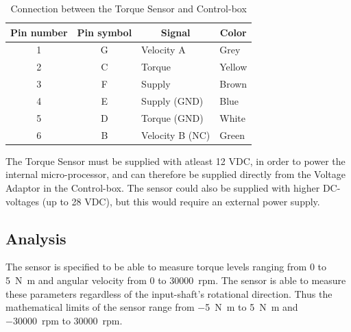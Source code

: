 \begin{table}[h]
	\centering
	\label{my-label}
	\begin{tabular}{|c|c|l|l|}
		\hline
		\textbf{Pin number} & \textbf{Pin symbol} & \multicolumn{1}{c|}{\textbf{Signal}} & \multicolumn{1}{c|}{\textbf{Color}} \\ \hline
		1                   & G                   & Velocity A                           & Grey                                \\ \hline
		2                   & C                   & Torque                               & Yellow                              \\ \hline
		3                   & F                   & Supply		                         & Brown                               \\ \hline
		4                   & E                   & Supply (GND)                         & Blue                                \\ \hline
		5                   & D                   & Torque (GND)                         & White                               \\ \hline
		6                   & B                   & Velocity B (NC)                      & Green                               \\ \hline
	\end{tabular}
	\caption{Connection between the Torque Sensor and Control-box}
\end{table}

The Torque Sensor must be supplied with atleast 12 VDC, in order to power the internal micro-processor, and can therefore be supplied directly from the Voltage Adaptor in the Control-box. The sensor could also be supplied with higher DC-voltages (up to 28 VDC), but this would require an external power supply.

\subsection{Analysis}
The sensor is specified to be able to measure torque levels ranging from 0 to \SI{5}{\newton \meter} and angular velocity from 0 to \SI{30000}{rpm}\cite{TorqueSensor}. The sensor is able to measure these parameters regardless of the input-shaft's rotational direction. Thus the mathematical limits of the sensor range from \SI{-5}{\newton \meter} to \SI{+5}{\newton \meter} and \SI{-30000}{rpm} to \SI{+30000}{rpm}. 

